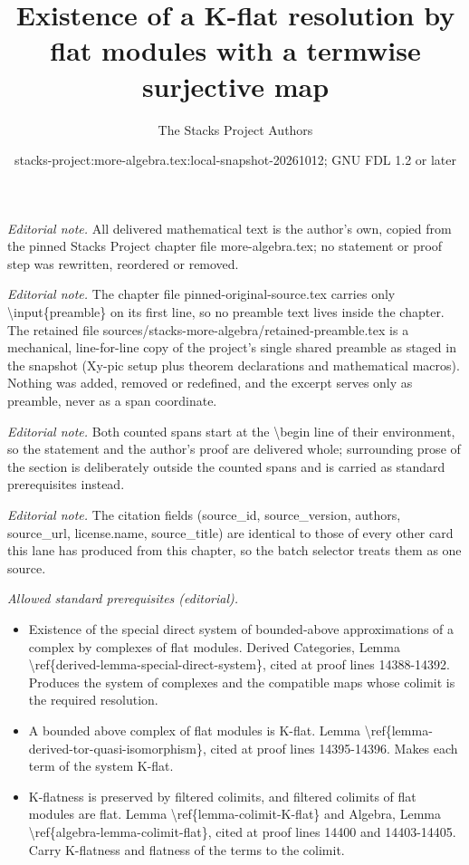 \documentclass[10pt,a4paper]{amsart}
\title{Existence of a K-flat resolution by flat modules with a termwise surjective map}
\author{The Stacks Project Authors}
\date{stacks-project:more-algebra.tex:local-snapshot-20261012; GNU FDL 1.2 or later}
\theoremstyle{plain}
\theoremstyle{definition}
\theoremstyle{remark}
\numberwithin{equation}{subsection}
\begin{document}
\maketitle
\setcounter{subsection}{1}
\noindent\textit{Editorial note.} All delivered mathematical text is the author's own, copied from the pinned Stacks Project chapter file more-algebra.tex; no statement or proof step was rewritten, reordered or removed.\par\medskip
\noindent\textit{Editorial note.} The chapter file pinned-original-source.tex carries only \textbackslash{}input\{preamble\} on its first line, so no preamble text lives inside the chapter. The retained file sources/stacks-more-algebra/retained-preamble.tex is a mechanical, line-for-line copy of the project's single shared preamble as staged in the snapshot (Xy-pic setup plus theorem declarations and mathematical macros). Nothing was added, removed or redefined, and the excerpt serves only as preamble, never as a span coordinate.\par\medskip
\noindent\textit{Editorial note.} Both counted spans start at the \textbackslash{}begin line of their environment, so the statement and the author's proof are delivered whole; surrounding prose of the section is deliberately outside the counted spans and is carried as standard prerequisites instead.\par\medskip
\noindent\textit{Editorial note.} The citation fields (source\_id, source\_version, authors, source\_url, license.name, source\_title) are identical to those of every other card this lane has produced from this chapter, so the batch selector treats them as one source.\par\medskip
\noindent\textit{Allowed standard prerequisites (editorial).}\begin{itemize}
\item Existence of the special direct system of bounded-above approximations of a complex by complexes of flat modules. Derived Categories, Lemma \textbackslash{}ref\{derived-lemma-special-direct-system\}, cited at proof lines 14388-14392. Produces the system of complexes and the compatible maps whose colimit is the required resolution.
\item A bounded above complex of flat modules is K-flat. Lemma \textbackslash{}ref\{lemma-derived-tor-quasi-isomorphism\}, cited at proof lines 14395-14396. Makes each term of the system K-flat.
\item K-flatness is preserved by filtered colimits, and filtered colimits of flat modules are flat. Lemma \textbackslash{}ref\{lemma-colimit-K-flat\} and Algebra, Lemma \textbackslash{}ref\{algebra-lemma-colimit-flat\}, cited at proof lines 14400 and 14403-14405. Carry K-flatness and flatness of the terms to the colimit.
\end{itemize}\medskip
\end{document}
